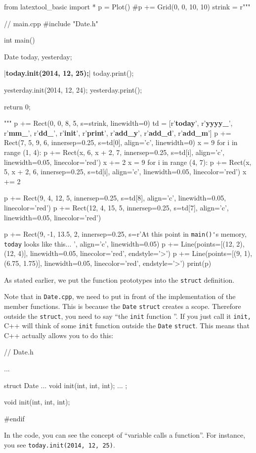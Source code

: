 \begin{python}
from latextool_basic import *
p = Plot()
#p += Grid(0, 0, 10, 10)
strink = r"""
\begin{consolethree}[escapeinside=||]
// main.cpp
#include "Date.h"

int main()
{
    Date today, yesterday;

    |\textbf{today.init(2014, 12, 25);}|
    today.print();
    
    yesterday.init(2014, 12, 24);
    yesterday.print();

    return 0;
}
\end{consolethree}
"""
p += Rect(0, 0, 8, 5, s=strink, linewidth=0)
td = [r'\textbf{today}', r'\textbf{yyyy\_}', r'\textbf{mm\_}', r'\textbf{dd\_}', r'\textbf{init}', r'\textbf{print}', r'\textbf{add\_y}', r'\textbf{add\_d}', r'\textbf{add\_m}']
p += Rect(7, 5, 9, 6, innersep=0.25, s=td[0], align='c', linewidth=0)
x = 9
for i in range (1, 4):
      p += Rect(x, 6, x + 2, 7, innersep=0.25, s=td[i], align='c', linewidth=0.05, linecolor='red')
      x += 2
x = 9
for i in range (4, 7):
      p += Rect(x, 5, x + 2, 6, innersep=0.25, s=td[i], align='c', linewidth=0.05, linecolor='red')
      x += 2

p += Rect(9, 4, 12, 5, innersep=0.25, s=td[8], align='c', linewidth=0.05, linecolor='red')
p += Rect(12, 4, 15, 5, innersep=0.25, s=td[7], align='c', linewidth=0.05, linecolor='red')

p += Rect(9, -1, 13.5, 2, innersep=0.25, s=r'At this point in \texttt{main()\'}s memory, \texttt{today} looks like this... ', align='c', linewidth=0.05)
p += Line(points=[(12, 2), (12, 4)], linewidth=0.05, linecolor='red', endstyle='>')
p += Line(points=[(9, 1), (6.75, 1.75)], linewidth=0.05, linecolor='red', endstyle='>')
print(p)
\end{python}

As stated earlier, we put the function prototypes into the \texttt{struct} definition.

Note that in \texttt{Date.cpp}, we need to put  in
front of the implementation of the member functions. This is because the
\texttt{Date} \texttt{struct} creates a scope. Therefore outside the
\texttt{struct}, you need to say ``the \texttt{init} function \texttt{}''. If you just call it \texttt{init,} C++ will think
of some \texttt{init} function outside the \texttt{Date} \texttt{struct}. This means that
C++ actually allows you to do this:
\begin{consolethree}
// Date.h

...

struct Date
{
    ...
    void init(int, int, int);
    ...
};

void init(int, int, int);

#endif
\end{consolethree}
In the code, you can see the concept of ``variable calls a function''.
For instance, you see \texttt{today.init(2014, 12, 25)}.

